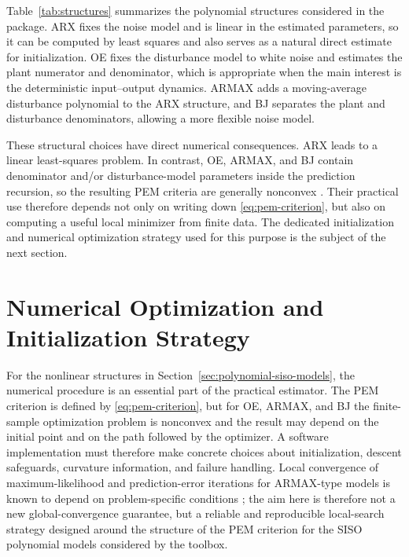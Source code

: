 \documentclass{ifacconf}
\begin{document}
Table~\ref{tab:structures} summarizes the polynomial structures considered in
the package.  ARX fixes the noise model and is linear in the estimated
parameters, so it can be computed by least squares and also serves as a natural
direct estimate for initialization.  OE fixes the disturbance model to white
noise and estimates the plant numerator and denominator, which is appropriate
when the main interest is the deterministic input--output dynamics.  ARMAX adds
a moving-average disturbance polynomial to the ARX structure, and BJ separates
the plant and disturbance denominators, allowing a more flexible noise model.

These structural choices have direct numerical consequences.  ARX leads to a
linear least-squares problem.  In contrast, OE, ARMAX, and BJ contain denominator
and/or disturbance-model parameters inside the prediction recursion, so the
resulting PEM criteria are generally nonconvex
\citep{astrom1974,soderstrom1982}.  Their practical use therefore
depends not only on writing down \eqref{eq:pem-criterion}, but also on computing
a useful local minimizer from finite data.  The dedicated initialization and
numerical optimization strategy used for this purpose is the subject of the next
section.

\section{Numerical Optimization and Initialization Strategy}
\label{sec:optimization-initialization}

For the nonlinear structures in Section~\ref{sec:polynomial-siso-models}, the
numerical procedure is an essential part of the practical estimator.  The PEM
criterion is defined by \eqref{eq:pem-criterion}, but for OE, ARMAX, and BJ the
finite-sample optimization problem is nonconvex and the result may depend on
the initial point and on the path followed by the optimizer.  A software
implementation must therefore make concrete choices about initialization,
descent safeguards, curvature information, and failure handling.  Local
convergence of maximum-likelihood and prediction-error iterations for
ARMAX-type models is known to depend on problem-specific conditions
\citep{goodwin2003}; the aim here is therefore not a new global-convergence
guarantee, but a reliable and reproducible local-search strategy designed around
the structure of the PEM criterion for the SISO polynomial models considered by
the toolbox.
\end{document}
